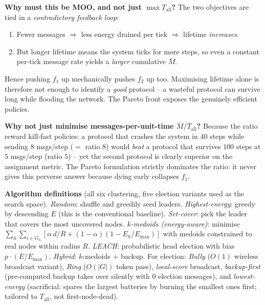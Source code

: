 \documentclass[a4paper,10pt]{article}
\begin{document}
\textbf{Why must this be MOO, and not just $\max T_{\text{all}}$?} The two objectives are tied in a
\emph{contradictory feedback loop}:
\begin{enumerate}
\item Fewer messages $\Rightarrow$ less energy drained per tick $\Rightarrow$ lifetime \emph{increases}.
\item But longer lifetime means the system ticks for more steps, so even a constant per-tick message rate yields a \emph{larger} cumulative $\bar M$.
\end{enumerate}
Hence pushing $f_1$ up mechanically pushes $f_2$ up too. Maximising lifetime alone is therefore not enough to identify a \emph{good} protocol -- a wasteful protocol can survive long while flooding the network. The Pareto front exposes the genuinely efficient policies.

\textbf{Why not just minimise messages-per-unit-time $\bar M/\bar T_{\text{all}}$?}
Because the ratio reward kill-fast policies: a protocol that crashes the system in $40$ steps while sending
$8$ msgs/step ($=$ ratio $8$) would \emph{beat} a protocol that survives $100$ steps at $5$ msgs/step
(ratio $5$) -- yet the second protocol is clearly superior on the assignment metric. The Pareto formulation
strictly dominates the ratio: it never gives this perverse answer because dying early collapses $f_1$.

\textbf{Algorithm definitions} (all six clustering, five election variants used as the search space).
\textit{Random}: shuffle and greedily seed leaders. \textit{Highest-energy}: greedy by descending $E$
(this is the conventional baseline). \textit{Set-cover}: pick the leader that covers the most uncovered nodes.
\textit{$k$-medoids (energy-aware)}: minimise $\sum_h\sum_{i\in G_h}[\alpha\,d/R+(1{-}\alpha)(1{-}E_h/E_{\max})]$ with medoids constrained to real nodes within radius $R$. \textit{LEACH}: probabilistic head election with bias $p\!\cdot\!(E/E_{\max})$. \textit{Hybrid}: $k$-medoids + backup. For election:
\textit{Bully} ($O(1)$ wireless broadcast variant), \textit{Ring} ($O(|G|)$ token pass), \textit{local-score} broadcast,
\textit{backup-first} (pre-computed backup takes over silently with $0$ election messages), and
\textit{lowest-energy} (sacrificial: spares the largest batteries by burning the smallest ones first; tailored to $T_{\text{all}}$, not first-node-dead).

\vspace{-0.4em}
\end{document}
